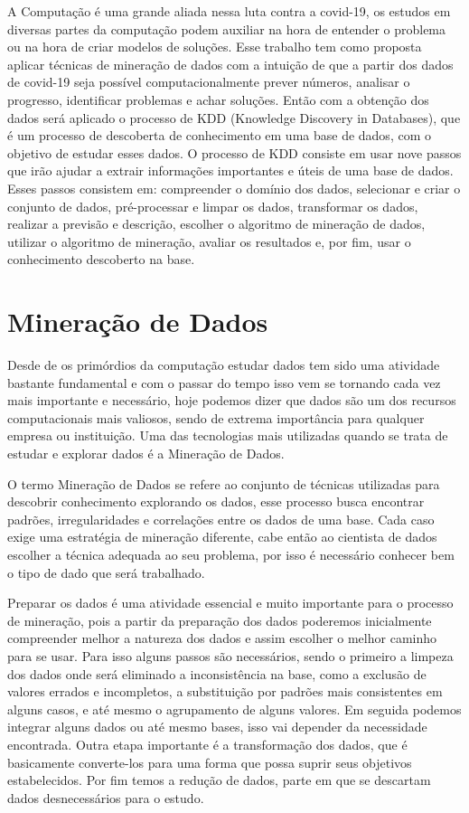 \documentclass[tcc1]{uftex}
\begin{document}
A Computação é uma grande aliada nessa luta contra a covid-19, os estudos em diversas partes da computação podem auxiliar na hora de entender o problema ou na hora de criar modelos de soluções. Esse trabalho tem como proposta aplicar técnicas de mineração de dados com a intuição de que a partir dos dados de covid-19 seja possível computacionalmente prever números, analisar o progresso, identificar problemas e achar soluções. Então com a obtenção dos dados será aplicado o processo de KDD (Knowledge Discovery in Databases), que é um processo de descoberta de conhecimento em uma base de dados, com o objetivo de estudar esses dados. O processo de KDD consiste em usar nove passos que irão ajudar a extrair informações importantes e úteis de uma base de dados. Esses passos consistem em: compreender o domínio dos dados, selecionar e criar o conjunto de dados, pré-processar e limpar os dados, transformar os dados, realizar a previsão e descrição, escolher o algoritmo de mineração de dados, utilizar o algoritmo de mineração, avaliar os resultados e, por fim, usar o conhecimento descoberto na base.\cite{fayyad1996kdd}

\chapter{Mineração de Dados}

Desde de os primórdios da computação estudar dados tem sido uma atividade bastante fundamental e com o passar do tempo isso vem se tornando cada vez mais importante e necessário, hoje podemos dizer que dados são um dos recursos computacionais mais valiosos, sendo de extrema importância para qualquer empresa ou instituição. Uma das tecnologias mais utilizadas quando se trata de estudar e explorar dados é a Mineração de Dados. 

	O termo Mineração de Dados se refere ao conjunto de técnicas utilizadas para descobrir conhecimento explorando os dados, esse processo busca encontrar padrões, irregularidades e correlações entre os dados de uma base. Cada caso exige uma estratégia de mineração diferente, cabe então ao cientista de dados escolher a técnica adequada ao seu problema, por isso é necessário conhecer bem o tipo de dado que será trabalhado. 
	
Preparar os dados é uma atividade essencial e muito importante para o processo de mineração, pois a partir da preparação dos dados poderemos inicialmente compreender melhor a natureza dos dados e assim escolher o melhor caminho para se usar. Para isso alguns passos são necessários, sendo o primeiro a limpeza dos dados onde será eliminado a inconsistência na base, como a exclusão de valores errados e incompletos, a substituição por padrões mais consistentes em alguns casos, e até mesmo o agrupamento de alguns valores. Em seguida podemos integrar alguns dados ou até mesmo bases, isso vai depender da necessidade encontrada. Outra etapa importante é a transformação dos dados, que é basicamente converte-los para uma forma que possa suprir seus objetivos estabelecidos. Por fim temos a redução de dados, parte em que se descartam dados desnecessários para o estudo.\cite{camilo2009mineraccao}
\end{document}
